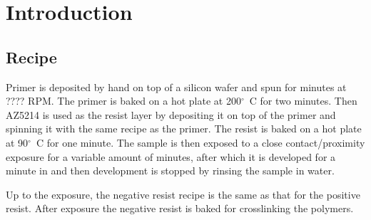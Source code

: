 \section*{Introduction}

\subsection*{Recipe}
Primer  is deposited by hand on top of a silicon wafer and spun for  minutes at ???? RPM. The primer is baked on a hot plate at 200$^{\circ}$~C for two minutes. Then AZ5214  is used as the resist layer by depositing it on top of the primer and spinning it with the same recipe as the primer. The resist is baked on a hot plate at 90$^{\circ}$~C for one minute. The sample is then exposed to a close contact/proximity  exposure for a variable amount of minutes, after which it is developed for a minute in  and then development is stopped by rinsing the sample in water.

Up to the exposure, the negative resist recipe is the same as that for the positive resist. After exposure the negative resist is baked for crosslinking the polymers.